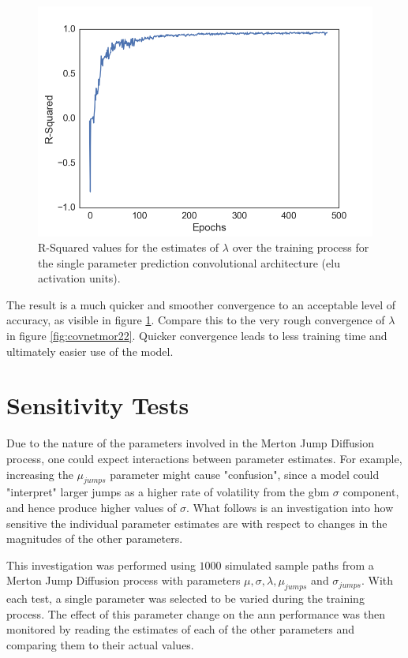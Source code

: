 \documentclass[11pt,oneside,openany,a4paper,english, report, goldenblock
]{usthesis}
\begin{document}
\begin{figure}[h]
	\centering
	\includegraphics[width=0.5\linewidth]{Images/Prediction-Convergence/ConvolutionalNN-SingleOutput/Lambda-RSquared}
	\caption[R-Squared values for the predictions of $\lambda$ over the training process for the single parameter prediction convolutional architecture (\acrshort{elu} activation units).]{R-Squared values for the estimates of $\lambda$ over the training process for the single parameter prediction convolutional architecture (\acrshort{elu} activation units).}
	\label{fig:lambda-rsquared}
\end{figure}

The result is a much quicker and smoother convergence to an acceptable level of accuracy, as visible in figure \ref{fig:lambda-rsquared}. Compare this to the very rough convergence of $\lambda$ in figure \ref{fig:covnetmor22}. Quicker convergence leads to less training time and ultimately easier use of the model.

\section{Sensitivity Tests}
Due to the nature of the parameters involved in the Merton Jump Diffusion process, one could expect interactions between parameter estimates. For example, increasing the $\mu_{jumps}$ parameter might cause "confusion", since a model could "interpret" larger jumps as a higher rate of volatility from the \acrshort{gbm} $\sigma$ component, and hence produce higher values of $\sigma$. What follows is an investigation into how sensitive the individual parameter estimates are with respect to changes in the magnitudes of the other parameters. 

This investigation was performed using $1000$ simulated sample paths from a Merton Jump Diffusion process with parameters $\mu, \sigma, \lambda, \mu_{jumps}$ and $\sigma_{jumps}$. With each test, a single parameter was selected to be varied during the training process. The effect of this parameter change on the \acrshort{ann} performance was then monitored by reading the estimates of each of the other parameters and comparing them to their actual values.
\end{document}
